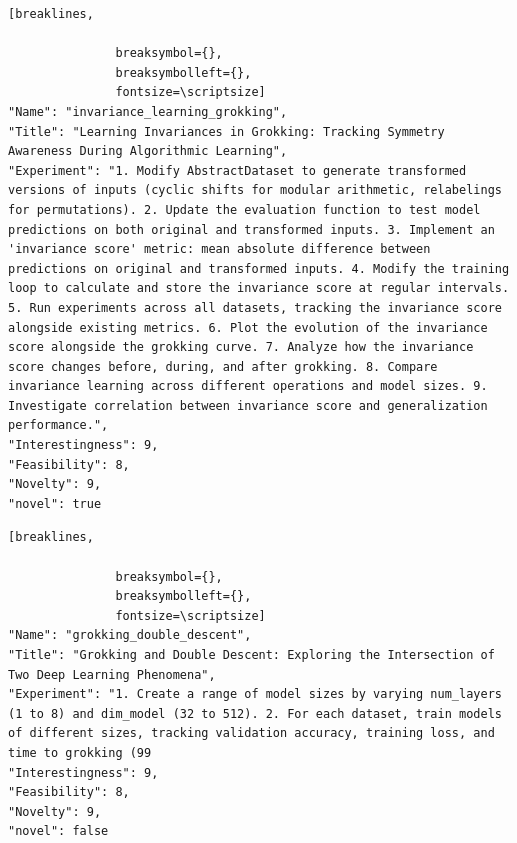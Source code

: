 \begin{tcolorbox}[
  breakable,
  colback  = blue!5!white,
  colframe = blue!75!black,
  title    = {Idea 23/50 - \texttt{invariance\_learning\_grokking}},
  fontupper=\scriptsize\ttfamily,
]
\begin{Verbatim}[breaklines,

               breaksymbol={},
               breaksymbolleft={},
               fontsize=\scriptsize]
"Name": "invariance_learning_grokking",
"Title": "Learning Invariances in Grokking: Tracking Symmetry Awareness During Algorithmic Learning",
"Experiment": "1. Modify AbstractDataset to generate transformed versions of inputs (cyclic shifts for modular arithmetic, relabelings for permutations). 2. Update the evaluation function to test model predictions on both original and transformed inputs. 3. Implement an 'invariance score' metric: mean absolute difference between predictions on original and transformed inputs. 4. Modify the training loop to calculate and store the invariance score at regular intervals. 5. Run experiments across all datasets, tracking the invariance score alongside existing metrics. 6. Plot the evolution of the invariance score alongside the grokking curve. 7. Analyze how the invariance score changes before, during, and after grokking. 8. Compare invariance learning across different operations and model sizes. 9. Investigate correlation between invariance score and generalization performance.",
"Interestingness": 9,
"Feasibility": 8,
"Novelty": 9,
"novel": true
\end{Verbatim}
\end{tcolorbox}

\begin{tcolorbox}[
  breakable,
  colback  = blue!5!white,
  colframe = blue!75!black,
  title    = {Idea 24/50 - \texttt{grokking\_double\_descent}},
  fontupper=\scriptsize\ttfamily,
]
\begin{Verbatim}[breaklines,

               breaksymbol={},
               breaksymbolleft={},
               fontsize=\scriptsize]
"Name": "grokking_double_descent",
"Title": "Grokking and Double Descent: Exploring the Intersection of Two Deep Learning Phenomena",
"Experiment": "1. Create a range of model sizes by varying num_layers (1 to 8) and dim_model (32 to 512). 2. For each dataset, train models of different sizes, tracking validation accuracy, training loss, and time to grokking (99
"Interestingness": 9,
"Feasibility": 8,
"Novelty": 9,
"novel": false
\end{Verbatim}
\end{tcolorbox}

